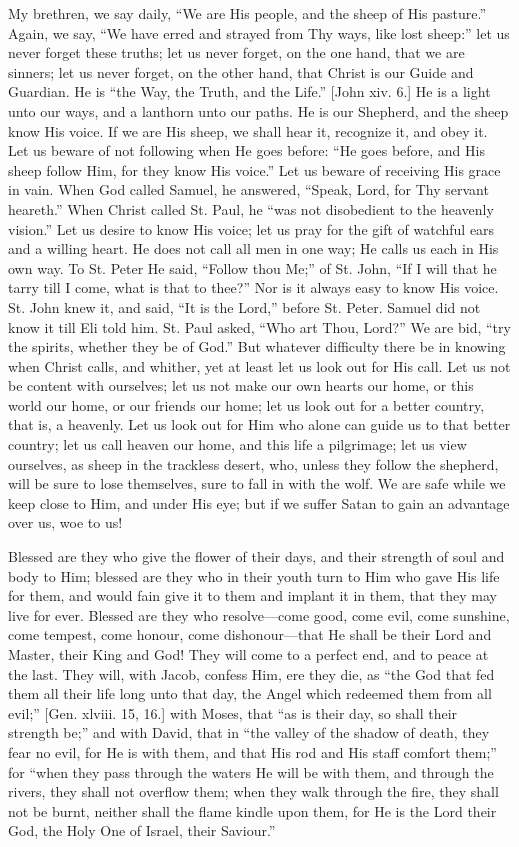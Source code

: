 My brethren, we say daily, ``We are His people, and the sheep
of His pasture.'' Again, we say, ``We have erred and strayed
from Thy ways, like lost sheep:'' let us never forget these
truths; let us never forget, on the one hand, that we are sinners; let
us never forget, on the other hand, that Christ is our Guide and
Guardian. He is ``the Way, the Truth, and the Life.'' [John
xiv. 6.] He is a light unto our ways, and a lanthorn unto our paths.
He is our Shepherd, and the sheep know His voice. If we are His sheep,
we shall hear it, recognize it, and obey it. Let us beware of not
following when He goes before: ``He goes before, and His sheep
follow Him, for they know His voice.'' Let us beware of receiving
His grace in vain. When God called Samuel, he answered, ``Speak,
Lord, for Thy servant heareth.'' When Christ called St. Paul, he
``was not disobedient to the heavenly vision.'' Let us desire
to know His voice; let us pray for the gift of watchful ears and a
willing heart. He does not call all men in one way; He calls us each
in His own way. To St. Peter He said, ``Follow thou Me;'' of
St. John, ``If I will that he tarry till I come, what is that to
thee?'' Nor is it always easy to know His voice. St. John knew it,
and said, ``It is the Lord,'' before St. Peter. Samuel did not
know it till Eli told him. St. Paul asked, ``Who art Thou,
Lord?'' We are bid, ``try the spirits, whether they be of
God.'' But whatever difficulty there be in knowing when Christ
calls, and whither, yet at least let us look out for His call. Let us
not be content with ourselves; let us not make our own hearts our
home, or this world our home, or our friends our home; let us look out
for a better country, that is, a heavenly. Let us look out for Him who
alone can guide us to that better country; let us call heaven our
home, and this life a pilgrimage; let us view ourselves, as sheep in
the trackless desert, who, unless they follow the shepherd, will be
sure to lose themselves, sure to fall in with the wolf. We are safe
while we keep close to Him, and under His eye; but if we suffer Satan
to gain an advantage over us, woe to us!

Blessed are they who give the flower of their days, and their
strength of soul and body to Him; blessed are they who in their youth
turn to Him who gave His life for them, and would fain give it to them
and implant it in them, that they may live for ever. Blessed are they
who resolve—come good, come evil, come sunshine, come tempest, come
honour, come dishonour—that He shall be their Lord and Master, their
King and God! They will come to a perfect end, and to peace at the
last. They will, with Jacob, confess Him, ere they die, as ``the
God that fed them all their life long unto that day, the Angel which
redeemed them from all evil;'' [Gen. xlviii. 15, 16.] with Moses,
that ``as is their day, so shall their strength be;'' and with
David, that in ``the valley of the shadow of death, they fear no
evil, for He is with them, and that His rod and His staff comfort
them;'' for ``when they pass through the waters He will be
with them, and through the rivers, they shall not overflow them; when
they walk through the fire, they shall not be burnt, neither shall the
flame kindle upon them, for He is the Lord their God, the Holy One of
Israel, their Saviour.''

